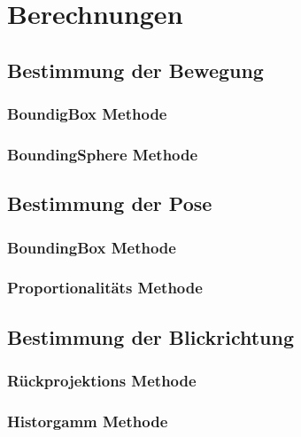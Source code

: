 
\chapter{Berechnungen}



\section{Bestimmung der Bewegung}
\subsection{BoundigBox Methode}
\subsection{BoundingSphere Methode}
\label{Kapitel_2_-_Unterkapitel_1}

\section{Bestimmung der Pose}
\subsection{BoundingBox Methode}
\subsection{Proportionalitäts Methode}

\section{Bestimmung der Blickrichtung}
\subsection{Rückprojektions Methode}
\subsection{Historgamm Methode}



%
